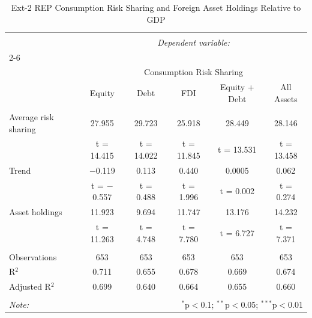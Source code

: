 
\begin{table}[!htbp] \centering 
  \caption{Ext-2 REP Consumption Risk Sharing and Foreign Asset Holdings Relative to GDP} 
  \label{} 
\begin{tabular}{@{\extracolsep{5pt}}lccccc} 
\\[-1.8ex]\hline 
\hline \\[-1.8ex] 
 & \multicolumn{5}{c}{\textit{Dependent variable:}} \\ 
\cline{2-6} 
\\[-1.8ex] & \multicolumn{5}{c}{Consumption Risk Sharing} \\ 
 & Equity & Debt & FDI & Equity + Debt & All Assets \\ 
\hline \\[-1.8ex] 
 Average risk sharing & 27.955 & 29.723 & 25.918 & 28.449 & 28.146 \\ 
  & t = 14.415 & t = 14.022 & t = 11.845 & t = 13.531 & t = 13.458 \\ 
  Trend & $-$0.119 & 0.113 & 0.440 & 0.0005 & 0.062 \\ 
  & t = $-$0.557 & t = 0.488 & t = 1.996 & t = 0.002 & t = 0.274 \\ 
  Asset holdings & 11.923 & 9.694 & 11.747 & 13.176 & 14.232 \\ 
  & t = 11.263 & t = 4.748 & t = 7.780 & t = 6.727 & t = 7.371 \\ 
 \hline \\[-1.8ex] 
Observations & 653 & 653 & 653 & 653 & 653 \\ 
R$^{2}$ & 0.711 & 0.655 & 0.678 & 0.669 & 0.674 \\ 
Adjusted R$^{2}$ & 0.699 & 0.640 & 0.664 & 0.655 & 0.660 \\ 
\hline 
\hline \\[-1.8ex] 
\textit{Note:}  & \multicolumn{5}{r}{$^{*}$p$<$0.1; $^{**}$p$<$0.05; $^{***}$p$<$0.01} \\ 
\end{tabular} 
\end{table} 
